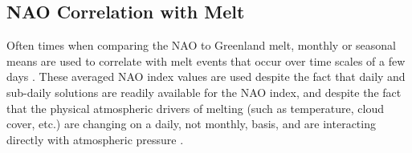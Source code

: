 \documentclass[11pt]{report}
\begin{document}
\begin{figure}[h]
\centering
{}
\caption[]{} \label{fig:Tslope}
\end{figure}

\subsection{NAO Correlation with Melt}
Often times when comparing the NAO to Greenland melt, monthly or seasonal means are used to correlate with melt events that occur over time scales of a few days \cite[see, for example, ][]{mattingly2018, bevis2018, angelen2014}. These averaged NAO index values are used despite the fact that daily and sub-daily solutions are readily available for the NAO index, and despite the fact that the physical atmospheric drivers of melting (such as temperature, cloud cover, etc.) are changing on a daily, not monthly, basis, and are interacting directly with atmospheric pressure \cite[for example,][]{mattingly2018}. 



\clearpage




\small
\renewcommand{\bibsep}{0em}

\renewcommand{\bibname}{References}


\end{document}
